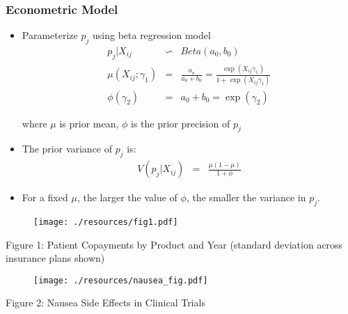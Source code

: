 
\begin{frame}
\frametitle{Econometric Model}

\begin{itemize}
\item Parameterize $p_{j}$ using beta regression model 
\begin{eqnarray*}  \label{mu_logit}
p_{j}|X_{ij} &\backsim &Beta(a_{0},b_{0}) \\
\mu(X_{ij};\gamma_{1}) &=& \frac{a_{o}}{a_{0}+b_{0}} = \frac{\exp
(X_{ij}\gamma_{1} )}{1+\exp(X_{ij}\gamma_{1} )} \\
\phi(\gamma_{2}) &=& a_{0}+b_{0}=\exp(\gamma_{2})
\end{eqnarray*}

where $\mu$ is prior mean, $\phi$ is the prior precision of $p_{j}$

\item The prior variance of $p_{j}$ is: 
\begin{eqnarray*}
V(p_{j}|X_{ij})&=&\frac{\mu(1-\mu)}{1+\phi}
\end{eqnarray*}

\item For a fixed $\mu$, the larger the value of $\phi$, the smaller the
variance in $p_{j}$.
\end{itemize}
\end{frame}


\begin{frame}[plain]

\begin{figure}[h!]
\centering\texttt{[image: ./resources/fig1.pdf]}
\end{figure}

Figure 1: Patient Copayments by Product and Year (standard deviation across
insurance plans shown)
\end{frame}


\begin{frame}[plain]

\begin{figure}[h!]
\centering\texttt{[image: ./resources/nausea\_fig.pdf]}
\end{figure}

Figure 2: Nausea Side Effects in Clinical Trials
\end{frame}

